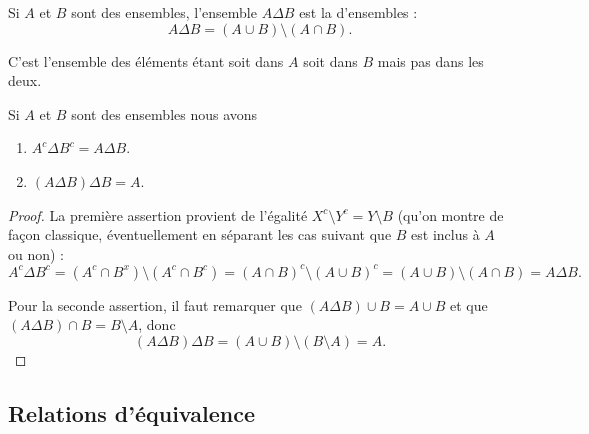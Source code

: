 \begin{definition}    \label{DefBMLooVjlSG}
    Si \( A\) et \( B\) sont des ensembles, l'ensemble \( A\Delta B\) est la  d'ensembles : 
    \begin{equation}
        A\Delta B=(A\cup B)\setminus(A\cap B).
    \end{equation}
\end{definition}
C'est l'ensemble des éléments étant soit dans \( A\) soit dans \( B\) mais pas dans les deux.

\begin{lemma}   \label{LemCUVoohKpWB}
    Si \( A\) et \( B\) sont des ensembles nous avons
    \begin{enumerate}
        \item\label{ItemVUCooHAztC}
            \( A^c\Delta B^c=A\Delta B\).
        \item\label{ItemVUCooHAztCii}
            \( (A\Delta B)\Delta B=A\).
    \end{enumerate}
\end{lemma}

\begin{proof}
    La première assertion provient de l'égalité \( X^c\setminus Y^c=Y\setminus B\) (qu'on montre de façon classique, éventuellement en séparant les cas suivant que \( B\) est inclus à \( A\) ou non) :
    \begin{equation}
        A^c\Delta B^c=(A^c\cap B^x)\setminus(A^c\cap B^c)=(A\cap B)^c\setminus(A\cup B)^c=(A\cup B)\setminus (A\cap B)=A\Delta B.
    \end{equation}

    Pour la seconde assertion, il faut remarquer que \( (A\Delta B)\cup B=A\cup B\) et que \( (A\Delta B)\cap B=B\setminus A\), donc
    \begin{equation}
        (A\Delta B)\Delta B=(A\cup B)\setminus (B\setminus A)=A.
    \end{equation}
\end{proof}

\subsection{Relations d'équivalence}
\label{appEquivalence}

